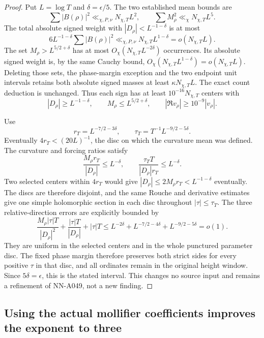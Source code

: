 \begin{proof}
Put \(L=\log T\) and \(\delta=\epsilon/5\).
The two established mean bounds are
\[
 \sum|B(\rho)|^2\ll_{\chi,P,\nu}N_{\chi,T}L^2,\qquad
 \sum M_\rho^2\ll_\chi N_{\chi,T}L^5.
\]
The total absolute signed weight with
\(|D_\rho|<L^{-1-\delta}\) is at most
\[
                  6L^{-1-\delta}\sum|B(\rho)|^2
                          \ll_{\chi,P,\nu}N_{\chi,T}L^{1-\delta}
                          =o(N_{\chi,T}L).
\]
The set \(M_\rho>L^{5/2+\delta}\) has at most
\(O_\chi(N_{\chi,T}L^{-2\delta})\) occurrences. Its
absolute signed weight is, by the same Cauchy bound,
\(O_\chi(N_{\chi,T}L^{1-\delta})=o(N_{\chi,T}L)\).
Deleting those sets, the phase-margin exception and the
two endpoint unit intervals retains both absolute signed
masses at least \(\kappa N_{\chi,T}L\).
The exact count deduction is unchanged. Thus each sign
has at least \(10^{-16}N_{\chi,T}\) centers with
\[
 |D_\rho|\ge L^{-1-\delta},\qquad
 M_\rho\le L^{5/2+\delta},\qquad
 |\Re v_\rho|\ge10^{-9}|v_\rho|.
\]

Use
\[
 r_T=L^{-7/2-3\delta},\qquad
 \tau_T=T^{-1}L^{-9/2-5\delta}.
\]
Eventually \(4r_T<(20L)^{-1}\), the disc on which the
curvature mean was defined. The curvature and forcing
ratios satisfy
\[
 \frac{M_\rho r_T}{|D_\rho|}\le L^{-\delta},\qquad
 \frac{\tau_TT}{|D_\rho|r_T}\le L^{-\delta}.
\]
Two selected centers within \(4r_T\) would give
\(|D_\rho|\le2M_\rho r_T< L^{-1-\delta}\)
eventually. The discs are therefore disjoint, and the
same Rouche and derivative estimates give one simple
holomorphic section in each disc throughout
\(|\tau|\le\tau_T\). The three relative-direction errors
are explicitly bounded by
\[
 \frac{M_\rho|\tau|T}{|D_\rho|^2}
        +\frac{|\tau|T}{|D_\rho|}+|\tau|T
 \le L^{-2\delta}+L^{-7/2-4\delta}+L^{-9/2-5\delta}
                                      =o(1).
\]
They are uniform in the selected centers and in the
whole punctured parameter disc. The fixed phase margin
therefore preserves both strict sides for every positive
\(\tau\) in that disc, and all ordinates remain in the
original height window. Since \(5\delta=\epsilon\), this
is the stated interval. This changes no source input
and remains a refinement of NN-A049, not a new finding.
\end{proof}



\subsection*{Using the actual mollifier coefficients improves the exponent to three}

